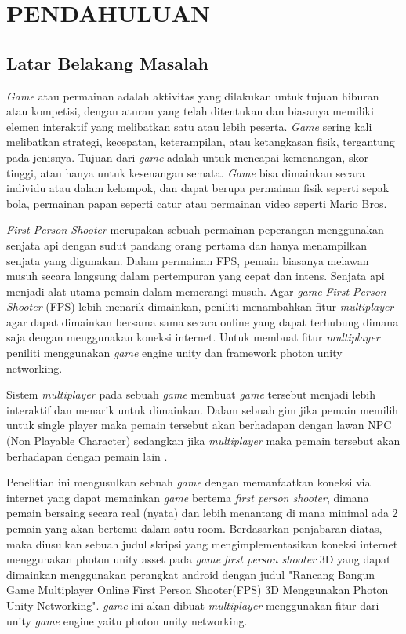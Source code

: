 \chapter{PENDAHULUAN}
\section{Latar Belakang Masalah}
\noindent

\textit{Game} atau permainan adalah aktivitas yang dilakukan untuk tujuan hiburan atau kompetisi, dengan aturan yang telah ditentukan dan biasanya memiliki elemen interaktif yang melibatkan satu atau lebih peserta. \textit{Game} sering kali melibatkan strategi, kecepatan, keterampilan, atau ketangkasan fisik, tergantung pada jenisnya. Tujuan dari \textit{game} adalah untuk mencapai kemenangan, skor tinggi, atau hanya untuk kesenangan semata. \textit{Game} bisa dimainkan secara individu atau dalam kelompok, dan dapat berupa permainan fisik seperti sepak bola, permainan papan seperti catur atau permainan video seperti Mario Bros\cite{fps}.

\textit{First Person Shooter} merupakan sebuah permainan peperangan menggunakan senjata api dengan sudut pandang orang pertama dan hanya menampilkan senjata yang digunakan.
Dalam permainan FPS, pemain biasanya melawan musuh secara langsung dalam pertempuran yang cepat dan intens\cite{fps}. Senjata api menjadi alat utama pemain dalam memerangi musuh.
Agar \textit{game} \textit{First Person Shooter} (FPS) lebih menarik dimainkan, peniliti menambahkan fitur \textit{multiplayer} agar dapat dimainkan bersama sama secara online yang dapat terhubung dimana saja dengan menggunakan koneksi internet. Untuk membuat fitur \textit{multiplayer} peniliti menggunakan \textit{game} engine unity dan framework photon unity networking.

Sistem \textit{multiplayer} pada sebuah \textit{\textit{game}} membuat \textit{\textit{game}} tersebut menjadi lebih interaktif dan menarik untuk dimainkan. Dalam sebuah gim jika pemain memilih untuk single player maka pemain tersebut akan berhadapan dengan lawan NPC (Non Playable Character) sedangkan jika \textit{multiplayer} maka pemain tersebut akan berhadapan dengan pemain lain \cite{Sarwodi}.


Penelitian ini mengusulkan sebuah \textit{\textit{game}} dengan memanfaatkan koneksi via internet yang dapat memainkan \textit{\textit{game}} bertema \textit{first person shooter}, dimana pemain bersaing secara real (nyata) dan lebih menantang di mana minimal ada 2 pemain yang akan bertemu dalam satu room.
Berdasarkan penjabaran diatas, maka diusulkan sebuah judul skripsi yang mengimplementasikan koneksi internet menggunakan photon unity asset pada \textit{\textit{game}} \textit{first person shooter} 3D yang dapat dimainkan menggunakan perangkat android dengan judul "Rancang Bangun Game Multiplayer Online First Person Shooter(FPS) 3D Menggunakan Photon Unity Networking".
\textit{\textit{game}} ini akan dibuat \textit{multiplayer} menggunakan fitur dari unity \textit{\textit{game}} engine yaitu photon unity networking.

